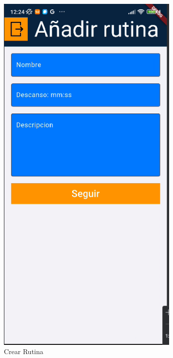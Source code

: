 \begin{figure}[H]
   \centering
    \includegraphics[width=0.8\textwidth]{pantallas/crearRutina.png}
    \caption{Crear Rutina}
    \label{fig:crearRutina}
\end{figure}

